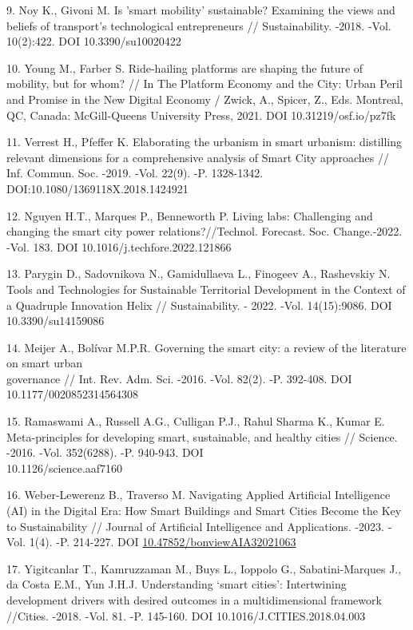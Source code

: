 \begin{references}
9. Noy K., Givoni M. Is 'smart mobility' sustainable? Examining the views
and beliefs of transport's technological entrepreneurs //
Sustainability. -2018. -Vol. 10(2):422. DOI 10.3390/su10020422

10. Young M., Farber S. Ride-hailing platforms are shaping the future of
mobility, but for whom? // In The Platform Economy and the City: Urban
Peril and Promise in the New Digital Economy / Zwick, A., Spicer, Z.,
Eds. Montreal, QC, Canada: McGill-Queens University Press, 2021. DOI
10.31219/osf.io/pz7fk

11. Verrest H., Pfeffer K. Elaborating the urbanism in smart urbanism:
distilling relevant dimensions for a comprehensive analysis of Smart
City approaches // Inf. Commun. Soc. -2019. -Vol. 22(9). -P.
1328-1342. DOI:10.1080/1369118X.2018.1424921

12. Nguyen H.T., Marques P., Benneworth P. Living labs: Challenging and
changing the smart city power relations?//Technol. Forecast. Soc.
Change.-2022. -Vol. 183.
DOI 10.1016/j.techfore.2022.121866

13. Parygin D., Sadovnikova N., Gamidullaeva L., Finogeev A., Rashevskiy
N. Tools and Technologies for Sustainable Territorial Development in
the Context of a Quadruple Innovation Helix // Sustainability. - 2022.
-Vol. 14(15):9086. DOI 10.3390/su14159086

14. Meijer A., Bolívar M.P.R. Governing the smart city: a review of the
literature on smart urban \\governance // Int. Rev. Adm. Sci. -2016. -Vol.
82(2). -P. 392-408. DOI 10.1177/0020852314564308

15. Ramaswami A., Russell A.G., Culligan P.J., Rahul Sharma K., Kumar E.
Meta-principles for developing smart, sustainable, and healthy cities
// Science. -2016. -Vol. 352(6288). -P. 940-943. DOI\\
10.1126/science.aaf7160

16. Weber-Lewerenz B., Traverso M. Navigating Applied Artificial
Intelligence (AI) in the Digital Era: How Smart Buildings and Smart
Cities Become the Key to Sustainability // Journal of Artificial
Intelligence and Applications. -2023. -Vol. 1(4). -P. 214-227.
DOI \href{http://dx.doi.org/10.47852/bonviewAIA32021063}{10.47852/bonviewAIA32021063}

17. Yigitcanlar T., Kamruzzaman M., Buys L., Ioppolo G., Sabatini-Marques
J., da Costa E.M., Yun J.H.J. Understanding `smart cities':
Intertwining development drivers with desired outcomes in a
multidimensional framework //Cities. -2018. -Vol. 81. -P. 145-160.
DOI 10.1016/J.CITIES.2018.04.003


\end{references}
